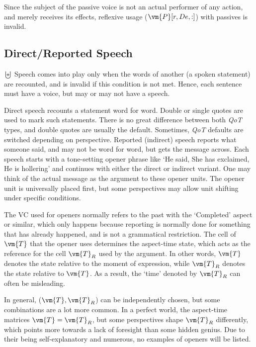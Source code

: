 Since the subject of the passive voice is not an actual performer of any action, and merely receives its effects, reflexive usage ($\vm{P}[r,De,:]$) with passives is invalid.
\subsection{Direct/Reported Speech}
$\biguplus$ Speech comes into play only when the words of another (a spoken statement) are recounted, and is invalid if this condition is not met. Hence, each sentence must have a voice, but may or may not have a speech.

Direct speech recounts a  statement word for word. Double  or single quotes are used to mark such statements. There is no great difference between both \textit{QoT} types, and double  quotes are usually the default. Sometimes,  \textit{QoT} defaults are switched depending on perspective. Reported (indirect) speech reports what someone  said, and may not be word for word, but gets the message across. Each speech starts with a tone-setting opener phrase like `He said, She has exclaimed, He is hollering' and continues with either the direct or indirect variant. One may think of the actual message as the argument to these opener units. The  opener unit is universally placed first, but  some perspectives may allow unit shifting under specific conditions.

The VC used for openers normally refers to the past with the `Completed' aspect or similar, which only happens because reporting is normally done for something that has already happened, and is not a grammatical restriction. The cell of $\vm{T}$ that  the opener uses determines the aspect-time state, which acts as the reference for the cell $\vm{T}_R$ used by the argument. In other words, $\vm{T}$ denotes the state relative to the moment of expression, while $\vm{T}_R$ denotes the state relative to $\vm{T}$. As a result, the `time' denoted by $\vm{T}_R$ can often be misleading.

In general, ($\vm{T}, \vm{T}_R$) can be independently chosen, but some combinations are a lot more common. In a perfect world, the aspect-time matrices $\vm{T}=\vm{T}_R$, but some perspectives shape $\vm{T}_R$  differently, which points more towards a lack of foresight than some hidden genius. Due to their being self-explanatory and numerous, no examples of openers will be listed.

